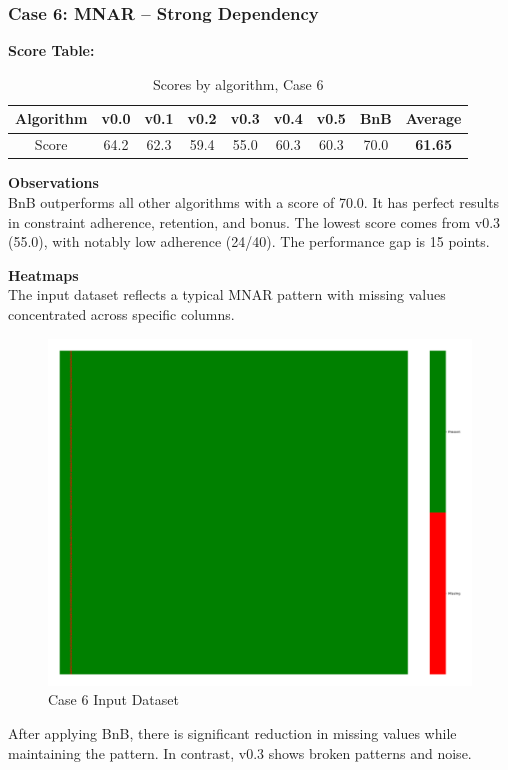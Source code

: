\documentclass[a4paper,12pt]{article}
\begin{document}
\subsubsection{Case 6: MNAR – Strong Dependency}

\textbf{Score Table:}

\begin{table}[H]
\centering
\caption{Scores by algorithm, Case 6}
\label{tab:score_algorithms_case6}
\begin{tabular}{|c|c|c|c|c|c|c|c|c|}
\hline
Algorithm & v0.0 & v0.1 & v0.2 & v0.3 & v0.4 & v0.5 & BnB & Average \\
\hline
Score & 64.2 & 62.3 & 59.4 & 55.0 & 60.3 & 60.3 & 70.0 & \textbf{61.65} \\
\hline
\end{tabular}
\end{table}

\textbf{Observations}\\
BnB outperforms all other algorithms with a score of 70.0. It has perfect results in constraint adherence, retention, and bonus. The lowest score comes from v0.3 (55.0), with notably low adherence (24/40). The performance gap is 15 points. 

\textbf{Heatmaps}\\
The input dataset reflects a typical MNAR pattern with missing values concentrated across specific columns.

\begin{figure}[H]
    \centering
    \includegraphics[width=0.5\linewidth]{case6_heatmap_erased.png}
    \caption{Case 6 Input Dataset}
\end{figure}

After applying BnB, there is significant reduction in missing values while maintaining the pattern. In contrast, v0.3 shows broken patterns and noise.
\end{document}
